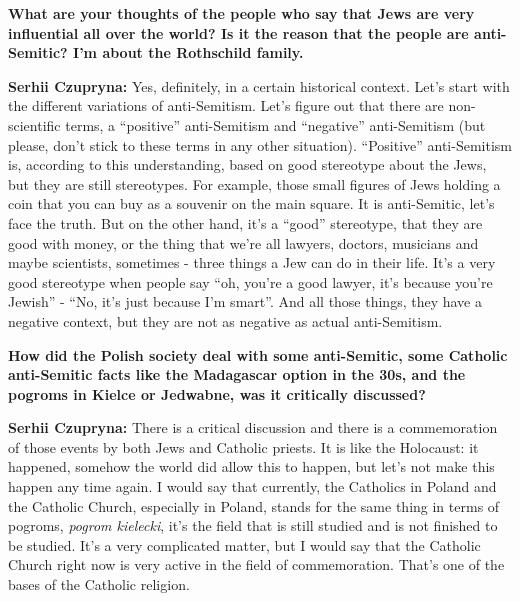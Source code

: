 \textbf{What are your thoughts of the people who say that Jews are very influential all over the world? Is it the reason that the people are anti-Semitic? I’m about the Rothschild family.}\par
\textbf{Serhii Czupryna:} Yes, definitely, in a certain historical context. Let’s start with the different variations of anti-Semitism. Let’s figure out that there are non-scientific terms, a ``positive'' anti-Semitism and ``negative'' anti-Semitism (but please, don’t stick to these terms in any other situation). ``Positive'' anti-Semitism is, according to this understanding, based on good stereotype about the Jews, but they are still stereotypes. For example, those small figures of Jews holding a coin that you can buy as a souvenir on the main square. It is anti-Semitic, let’s face the truth. But on the other hand, it’s a ``good'' stereotype, that they are good with money, or the thing that we’re all lawyers, doctors, musicians and maybe scientists, sometimes - three things a Jew can do in their life. It’s a very good stereotype when people say ``oh, you’re a good lawyer, it’s because you’re Jewish'' - ``No, it’s just because I’m smart''. And all those things, they have a negative context, but they are not as negative as actual anti-Semitism.\par
\textbf{How did the Polish society deal with some anti-Semitic, some Catholic anti-Semitic facts like the Madagascar option in the 30s, and the pogroms in Kielce or Jedwabne, was it critically discussed?}\par  
\textbf{Serhii Czupryna:} There is a critical discussion and there is a commemoration of those events by both Jews and Catholic priests. It is like the Holocaust: it happened, somehow the world did allow this to happen, but let’s not make this happen any time again. I would say that currently, the Catholics in Poland and the Catholic Church, especially in Poland, stands for the same thing in terms of pogroms, \textit{pogrom kielecki}, it’s the field that is still studied and is not finished to be studied. It’s a very complicated matter, but I would say that the Catholic Church right now is very active in the field of commemoration. That’s one of the bases of the Catholic religion.